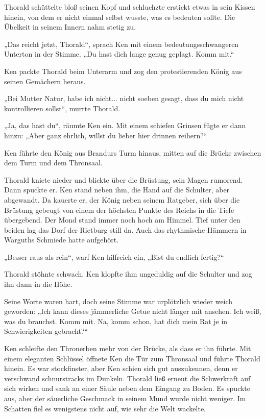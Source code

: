 Thorald schüttelte bloß seinen Kopf und schluchzte erstickt etwas in sein Kissen hinein, von dem er nicht einmal selbst wusste, was es bedeuten sollte. Die Übelkeit in seinem Innern nahm stetig zu.

„Das reicht jetzt, Thorald“, sprach Ken mit einem bedeutungsschwangeren Unterton in der Stimme. „Du hast dich lange genug geplagt. Komm mit.“

Ken packte Thorald beim Unterarm und zog den protestierenden König aus seinen Gemächern heraus.

„Bei Mutter Natur, habe ich nicht... nicht soeben gesagt, dass du mich nicht kontrollieren sollst“, murrte Thorald.

„Ja, das hast du“, räumte Ken ein. Mit einem schiefen Grinsen fügte er dann hinzu: „Aber ganz ehrlich, willst du lieber hier drinnen reihern?“



\trennzeichen



Ken führte den König aus Brandurs Turm hinaus, mitten auf die Brücke zwischen dem Turm und dem Thronsaal.

Thorald kniete nieder und blickte über die Brüstung, sein Magen rumorend. Dann spuckte er. Ken stand neben ihm, die Hand auf die Schulter, aber abgewandt. Da kauerte er, der König neben seinem Ratgeber, sich über die Brüstung gebeugt von einem der höchsten Punkte des Reichs in die Tiefe übergebend. Der Mond stand immer noch hoch am Himmel. Tief unter den beiden lag das Dorf der Rietburg still da. Auch das rhythmische Hämmern in Warguths Schmiede hatte aufgehört.

„Besser raus als rein“, warf Ken hilfreich ein, „Bist du endlich fertig?“

Thorald stöhnte schwach. Ken klopfte ihm ungeduldig auf die Schulter und zog ihn dann in die Höhe.

Seine Worte waren hart, doch seine Stimme war urplötzlich wieder weich geworden: „Ich kann dieses jämmerliche Getue nicht länger mit ansehen. Ich weiß, was du brauchst. Komm mit. Na, komm schon, hat dich mein Rat je in Schwierigkeiten gebracht?“

Ken schleifte den Thronerben mehr von der Brücke, als dass er ihn führte. Mit einem eleganten Schlüssel öffnete Ken die Tür zum Thronsaal und führte Thorald hinein. Es war stockfinster, aber Ken schien sich gut auszukennen, denn er verschwand schnurstracks im Dunkeln. Thorald ließ erneut die Schwerkraft auf sich wirken und sank an einer Säule neben dem Eingang zu Boden. Es spuckte aus, aber der säuerliche Geschmack in seinem Mund wurde nicht weniger. Im Schatten fiel es wenigstens nicht auf, wie sehr die Welt wackelte.

